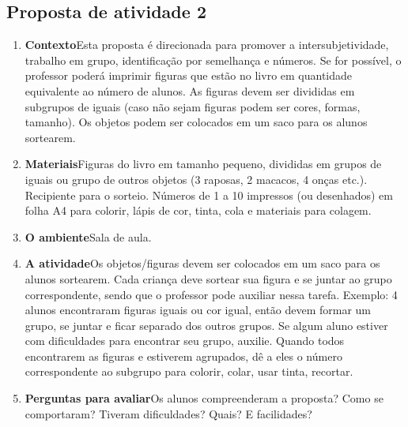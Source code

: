 \documentclass[11pt]{extarticle}
\begin{document}
\subsection{Proposta de atividade 2}


\begin{enumerate}
\item \textbf{Contexto}\quad Esta proposta é direcionada para promover a intersubjetividade, trabalho em grupo, identificação por semelhança e números. Se for possível, o professor poderá imprimir figuras que estão no livro em quantidade equivalente ao número de alunos. As figuras devem ser divididas em subgrupos de iguais (caso não sejam figuras podem ser cores, formas, tamanho). Os objetos podem ser colocados em um saco para os alunos sortearem.

\item \textbf{Materiais}\quad Figuras do livro em tamanho pequeno, divididas em grupos de iguais ou grupo de outros objetos (3 raposas, 2 macacos, 4 onças etc.). Recipiente para o sorteio. Números de 1 a 10 impressos (ou desenhados) em folha A4 para colorir, lápis de cor, tinta, cola e materiais para colagem.

\item \textbf{O ambiente}\quad Sala de aula. 

\item \textbf{A atividade}\quad Os objetos/figuras devem ser colocados em um saco para os alunos sortearem. Cada criança deve sortear sua figura e se  juntar ao grupo correspondente, sendo que o professor pode auxiliar nessa tarefa. Exemplo: 4 alunos encontraram figuras iguais ou cor igual, então devem formar um grupo, se juntar e ficar separado dos outros grupos.
Se algum aluno estiver com dificuldades para encontrar seu grupo, auxilie. Quando todos encontrarem as figuras e estiverem agrupados, dê a eles o número correspondente ao subgrupo para colorir, colar, usar tinta, recortar.


\item \textbf{Perguntas para avaliar}\quad Os alunos compreenderam a proposta? Como se comportaram? Tiveram dificuldades? Quais? E facilidades? 
\end{enumerate}
\end{document}
